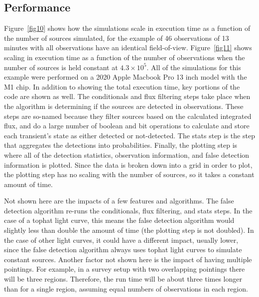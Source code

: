 \documentclass[12pt]{article}
\begin{document}
\clearpage
\doublespacing
\subsection{Performance}\label{performance}
Figure~\ref{fig10} shows how the simulations scale in execution time as a function of the number of sources simulated, for the example of 46 observations of 13 minutes with all observations have an identical field-of-view. Figure~\ref{fig11} shows scaling in execution time as a function of the number of observations when the number of sources is held constant at $4.3\times10^{5}$.  All of the simulations for this example were performed on a 2020 Apple Macbook Pro 13 inch model with the M1 chip. In addition to showing the total execution time, key portions of the code are shown as well. The conditionals and flux filtering steps take place when the algorithm is determining if the sources are detected in observations. These steps are so-named because they filter sources based on the calculated integrated flux, and do a large number of boolean and bit operations to calculate and store each transient's state as either detected or not-detected. The stats step is the step that aggregates the detections into probabilities. Finally, the plotting step is where all of the detection statistics, observation information, and false detection information is plotted. Since the data is broken down into a grid in order to plot, the plotting step has no scaling with the number of sources, so it takes a constant amount of time. 

Not shown here are the impacts of a few features and algorithms. The false detection algorithm re-runs the conditionals, flux filtering, and stats steps. In the case of a tophat light curve, this means the false detection algorithm would slightly less than double the amount of time (the plotting step is not doubled). In the case of other light curves, it could have a different impact, usually lower, since the false detection algorithm always uses tophat light curves to simulate constant sources. Another factor not shown here is the impact of having multiple pointings. For example, in a survey setup with two overlapping pointings there will be three regions. Therefore, the run time will be about three times longer than for a single region, assuming equal numbers of observations in each region. 
\end{document}
